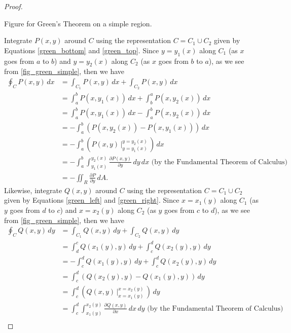 \begin{proof}
\begin{lxfigure}
\begin{center}
 \caption{Figure for Green's Theorem on a simple region.}
 \label{fig_green_simple}
 \end{center}
 \end{lxfigure}
 Integrate $P(x,y)$ around $C$ using the representation $C = C_1 \cup C_2$ given by Equations \eqref{green_bottom} and \eqref{green_top}. Since $y = y_1(x)$ along $C_1$ (as $x$ goes from $a$ to $b$) and $y = y_2(x)$ along $C_2$ (as $x$ goes from $b$ to $a$), as we see from \autoref{fig_green_simple}, then we have
 \begin{align*}
  \oint_C P(x,y)\,dx &= \int_{C_1} P(x,y)\,dx + \int_{C_2} P(x,y)\,dx\\
   &= \int_a^b P(x,y_1(x))\,dx + \int_b^a P(x,y_2(x))\,dx\\
   &= \int_a^b P(x,y_1(x))\,dx - \int_a^b P(x,y_2(x))\,dx\\[6pt]
   &= -\int_a^b \left( P(x,y_2(x)) - P(x,y_1(x)) \right)\,dx\\[6pt]
   &= -\int_a^b \left( P(x,y) \,\Big|_{y = y_1(x)}^{y = y_2(x)} \,\right)\,dx\\[6pt]
   &= -\int_a^b \int_{y_1(x)}^{y_2(x)} \frac{\partial P(x,y)}{\partial y}\,dy\,dx \text{ (by the Fundamental Theorem of Calculus)}\\[6pt]
   &= -\iint_{R} \frac{\partial P}{\partial y}\,dA .
 \end{align*}
 Likewise, integrate $Q(x,y)$ around $C$ using the representation $C = C_1 \cup C_2$ given by Equations \eqref{green_left} and \eqref{green_right}. Since $x = x_1(y)$ along $C_1$ (as $y$ goes from $d$ to $c$) and $x = x_2(y)$ along $C_2$ (as $y$ goes from $c$ to $d$), as we see from \autoref{fig_green_simple}, then we have
 \begin{align*}
  \oint_C Q(x,y)\,dy &= \int_{C_1} Q(x,y)\,dy + \int_{C_2} Q(x,y)\,dy\\
   &= \int_d^c Q(x_1(y),y)\,dy + \int_c^d Q(x_2(y),y)\,dy\\
   &= -\int_c^d Q(x_1(y),y)\,dy + \int_c^d Q(x_2(y),y)\,dy\\[6pt]
   &= \int_c^d \left( Q(x_2(y),y) - Q(x_1(y),y) \right)\,dy\\[6pt]
   &= \int_c^d \left( Q(x,y) \,\Big|_{x = x_1(y)}^{x = x_2(y)} \,\right)\,dy\\[6pt]
   &= \int_c^d \int_{x_1(y)}^{x_2(y)} \frac{\partial Q(x,y)}{\partial x}\,dx\,dy \text{ (by the Fundamental Theorem of Calculus)}\\[6pt]

\end{align*}
\end{proof}
